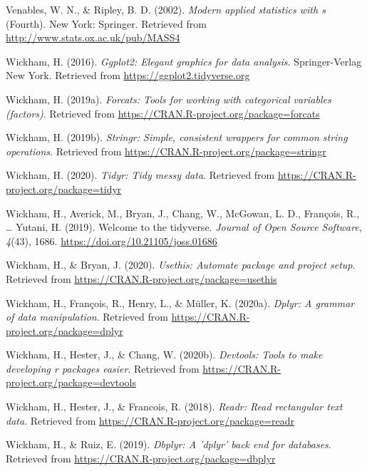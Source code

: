 \documentclass[
  english,
  man]{apa6}
\begin{document}
\leavevmode\hypertarget{ref-R-MASS}{}%
Venables, W. N., \& Ripley, B. D. (2002). \emph{Modern applied statistics with s} (Fourth). New York: Springer. Retrieved from \url{http://www.stats.ox.ac.uk/pub/MASS4}

\leavevmode\hypertarget{ref-R-ggplot2}{}%
Wickham, H. (2016). \emph{Ggplot2: Elegant graphics for data analysis}. Springer-Verlag New York. Retrieved from \url{https://ggplot2.tidyverse.org}

\leavevmode\hypertarget{ref-R-forcats}{}%
Wickham, H. (2019a). \emph{Forcats: Tools for working with categorical variables (factors)}. Retrieved from \url{https://CRAN.R-project.org/package=forcats}

\leavevmode\hypertarget{ref-R-stringr}{}%
Wickham, H. (2019b). \emph{Stringr: Simple, consistent wrappers for common string operations}. Retrieved from \url{https://CRAN.R-project.org/package=stringr}

\leavevmode\hypertarget{ref-R-tidyr}{}%
Wickham, H. (2020). \emph{Tidyr: Tidy messy data}. Retrieved from \url{https://CRAN.R-project.org/package=tidyr}

\leavevmode\hypertarget{ref-R-tidyverse}{}%
Wickham, H., Averick, M., Bryan, J., Chang, W., McGowan, L. D., François, R., \ldots{} Yutani, H. (2019). Welcome to the tidyverse. \emph{Journal of Open Source Software}, \emph{4}(43), 1686. \url{https://doi.org/10.21105/joss.01686}

\leavevmode\hypertarget{ref-R-usethis}{}%
Wickham, H., \& Bryan, J. (2020). \emph{Usethis: Automate package and project setup}. Retrieved from \url{https://CRAN.R-project.org/package=usethis}

\leavevmode\hypertarget{ref-R-dplyr}{}%
Wickham, H., François, R., Henry, L., \& Müller, K. (2020a). \emph{Dplyr: A grammar of data manipulation}. Retrieved from \url{https://CRAN.R-project.org/package=dplyr}

\leavevmode\hypertarget{ref-R-devtools}{}%
Wickham, H., Hester, J., \& Chang, W. (2020b). \emph{Devtools: Tools to make developing r packages easier}. Retrieved from \url{https://CRAN.R-project.org/package=devtools}

\leavevmode\hypertarget{ref-R-readr}{}%
Wickham, H., Hester, J., \& Francois, R. (2018). \emph{Readr: Read rectangular text data}. Retrieved from \url{https://CRAN.R-project.org/package=readr}

\leavevmode\hypertarget{ref-R-dbplyr}{}%
Wickham, H., \& Ruiz, E. (2019). \emph{Dbplyr: A 'dplyr' back end for databases}. Retrieved from \url{https://CRAN.R-project.org/package=dbplyr}
\end{document}
